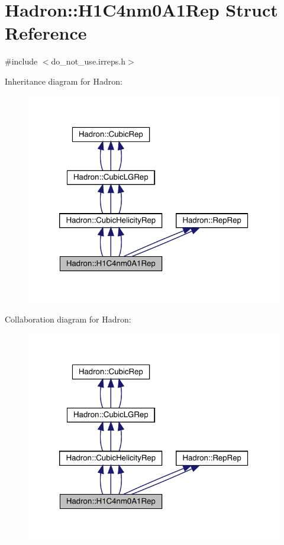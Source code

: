 \hypertarget{structHadron_1_1H1C4nm0A1Rep}{}\section{Hadron\+:\+:H1\+C4nm0\+A1\+Rep Struct Reference}
\label{structHadron_1_1H1C4nm0A1Rep}


{\ttfamily \#include $<$do\+\_\+not\+\_\+use.\+irreps.\+h$>$}



Inheritance diagram for Hadron\+:
\nopagebreak
\begin{figure}[H]
\begin{center}
\leavevmode
\includegraphics[width=320pt]{dc/daa/structHadron_1_1H1C4nm0A1Rep__inherit__graph}
\end{center}
\end{figure}


Collaboration diagram for Hadron\+:
\nopagebreak
\begin{figure}[H]
\begin{center}
\leavevmode
\includegraphics[width=320pt]{d9/d3a/structHadron_1_1H1C4nm0A1Rep__coll__graph}
\end{center}
\end{figure}
